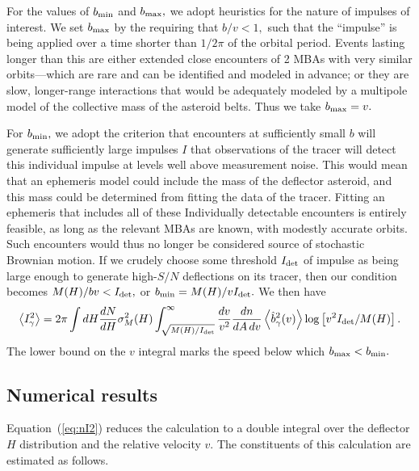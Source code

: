 \documentclass[linenumbers, onecolumn]{aastex631}
\newcommand{\eqq}[1]{Equation~(\ref{#1})}
\begin{document}
For the values of $b_{\rm min}$ and $b_{\rm max},$ we adopt heuristics
for the nature of impulses of interest.  We set $b_{\rm max}$ by the
requiring that $b/v<1,$ such that the ``impulse'' is being applied
over a time shorter than $1/2\pi$ of the orbital period.  Events
lasting longer than this are either extended close encounters of 2
MBAs with very similar orbits---which are rare and can be identified
and modeled in advance; or they are slow, longer-range interactions
that would be adequately modeled by a multipole model of the
collective mass of the asteroid belts.  Thus we take $b_{\rm max}=v.$

For $b_{\rm min},$ we adopt the criterion that encounters at
sufficiently small $b$ will generate sufficiently large impulses $I$
that observations of the tracer will detect this individual impulse at
levels well above measurement noise.  This would mean that an
ephemeris model could include the mass of the deflector asteroid, and
this mass could be determined from fitting the data of the tracer.
Fitting an ephemeris that includes all of these Individually
detectable encounters is entirely feasible, as long as the relevant
MBAs are known, with modestly accurate orbits.
Such encounters would thus no longer be considered source of
stochastic Brownian motion.  If we crudely choose some threshold
$I_{\rm det}$ of impulse as being large enough to generate high-$S/N$
deflections on its tracer, then our condition becomes $M(H)/bv <
I_{\rm det},$ or $b_{\rm min}=M(H)/vI_{\rm det}.$  We then have
\begin{equation}
   \left\langle I_\gamma^2 \right\rangle = 
2\pi \int dH \frac{dN}{dH} \sigma^2_M(H)  \int_{\sqrt{M(H)/I_{\rm
      det}}}^\infty \frac{dv}{v^2} 
        \frac{dn}{dA\,dv}  \left\langle\hat b_\gamma^2(v)\right\rangle
        \log \left[v^2 I_{\rm det}/M(H)\right].
        \label{eq:nI2}
      \end{equation}
The lower bound on the $v$ integral marks the speed below which
$b_{\rm max}<b_{\rm min}.$

\subsection{Numerical results}
\eqq{eq:nI2} reduces the calculation to a double integral over the
deflector $H$ distribution and the relative velocity $v.$  The
constituents of this calculation are estimated as follows.
\end{document}
